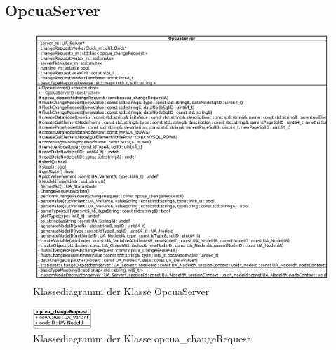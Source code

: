 \subsection{OpcuaServer}
\begin{figure}[ht]
  \centering
  \includegraphics[width=\textwidth]{content/hauptteil/umsetzungPoC/backend/uml/classesOfOverview/OpcuaServer.pdf}
  \caption{Klassediagramm der Klasse OpcuaServer}
  \label{fig:backend:classDiag:OpcuaServer}
\end{figure}
\begin{figure}[ht]
  \centering
  \includegraphics[width=0.2\textwidth]{content/hauptteil/umsetzungPoC/backend/uml/classesOfOverview/opcua_changeRequest.pdf}
  \caption{Klassediagramm der Klasse opcua\_changeRequest}
  \label{fig:backend:classDiag:opcuaCR}
\end{figure}
